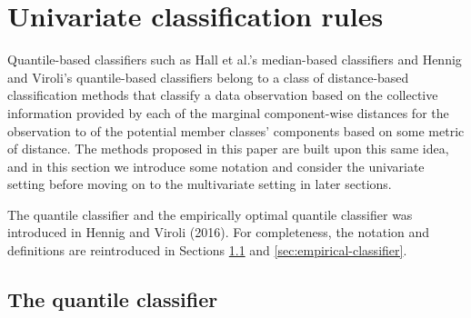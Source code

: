 
\section{Univariate classification rules}
\label{sec:univariate-classifier}

Quantile-based classifiers such as Hall et al.'s median-based classifiers and
Hennig and Viroli's quantile-based classifiers belong to a class of
distance-based classification methods that classify a data observation based on
the collective information provided by each of the marginal component-wise
distances for the observation to of the potential member classes' components
based on some metric of distance.  The methods proposed in this paper are built
upon this same idea, and in this section we introduce some notation and consider
the univariate setting before moving on to the multivariate setting in later
sections.

The quantile classifier and the empirically optimal quantile classifier was
introduced in Hennig and Viroli (2016).  For completeness, the notation and
definitions are reintroduced in Sections \ref{sec:quantile-classifier} and
\ref{sec:empirical-classifier}.


\subsection{The quantile classifier}
\label{sec:quantile-classifier}

